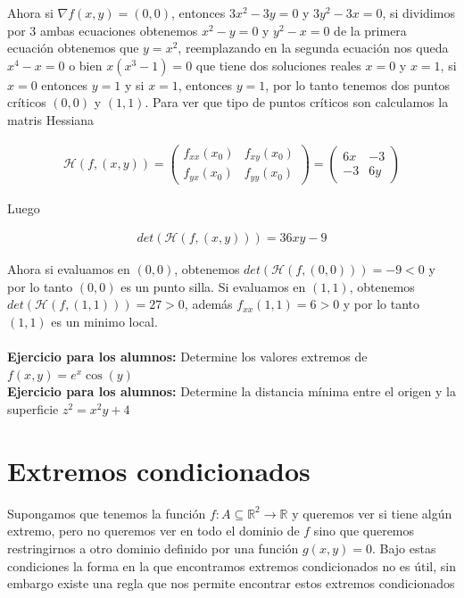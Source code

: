 \documentclass{article}
\theoremstyle{definition}
\begin{document}
Ahora si $\nabla f (x,y)=(0,0)$, entonces $3x^2-3y=0$ y $3y^2-3x=0$, si dividimos por $3$ ambas ecuaciones obtenemos  $x^2-y=0$ y $y^2-x=0$ de la primera ecuación obtenemos que $y=x^2$, reemplazando en la segunda ecuación nos queda $x^4-x=0$ o bien $x(x^3-1)=0$ que tiene dos soluciones reales $x=0$ y $x=1$, si $x=0$ entonces $y=1$ y si $x=1$, entonces $y=1$, por lo tanto tenemos dos puntos críticos $(0,0)$ y $(1,1)$. Para ver que tipo de puntos críticos son calculamos la matris Hessiana


\begin{align*}
    \mathcal{H}(f,(x,y)) = \begin{pmatrix}
        f_{xx}(x_0) & f_{xy}(x_0) \\
        f_{yx}(x_0) & f_{yy}(x_0)
    \end{pmatrix} = \begin{pmatrix}
        6x & -3 \\
        -3 & 6y
    \end{pmatrix}
\end{align*}

Luego

\begin{align*}
    det(\mathcal{H}(f,(x,y))) = 36xy-9
\end{align*}

Ahora si evaluamos en $(0,0)$, obtenemos $det(\mathcal{H}(f,(0,0))) =-9 < 0$ y por lo tanto $(0,0)$ es un punto silla. Si evaluamos en $(1,1)$, obtenemos $det(\mathcal{H}(f,(1,1))) =27 > 0$, además $f_{xx}(1,1)= 6 > 0$ y por lo tanto $(1,1)$ es un minimo local. \\ \\


\textbf{Ejercicio para los alumnos:} Determine los valores extremos de $f(x,y) = e^x\cos(y)$ \\

\textbf{Ejercicio para los alumnos:} Determine la distancia m\'inima entre el origen y la superficie $z^2=x^2y+4$\\


\newpage



\section{ Extremos condicionados}

Supongamos que tenemos la función  $f: A \subseteq \mathbb{R}^2 \to \mathbb{R}$ y queremos ver si tiene algún extremo, pero no queremos ver en todo el dominio de $f$ sino que queremos restringirnos a otro dominio definido por una función $g(x,y) =0$. Bajo estas condiciones la forma en la que encontramos extremos condicionados no es útil, sin embargo existe una regla que nos permite encontrar estos extremos condicionados \\
\end{document}

